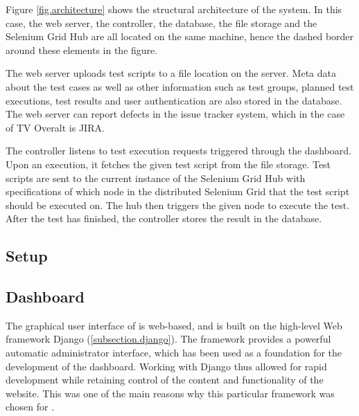 Figure \ref{fig.architecture} shows the structural architecture of the system. In this case, the web server, the controller, the database, the file storage and the Selenium Grid Hub are all located on the same machine, hence the dashed border around these elements in the figure.

The web server uploads test scripts to a file location on the server. Meta data about the test cases as well as other information such as test groups, planned test executions, test results and user authentication are also stored in the database. The web server can report defects in the issue tracker system, which in the case of TV Overalt is JIRA.

The controller listens to test execution requests triggered through the dashboard. Upon an execution, it fetches the given test script from the file storage. Test scripts are sent to the current instance of the Selenium Grid Hub with specifications of which node in the distributed Selenium Grid that the test script should be executed on. The hub then triggers the given node to execute the test. After the test has finished, the controller stores the result in the database.







\subsection{Setup}









\subsection{Dashboard}
The graphical user interface of \toolname \space is web-based, and is built on the high-level Web framework Django (\ref{subsection.django}). The framework provides a powerful automatic administrator interface, which has been used as a foundation for the development of the dashboard. Working with Django thus allowed for rapid development while retaining control of the content and functionality of the website. This was one of the main reasons why this particular framework was chosen for \toolname.

